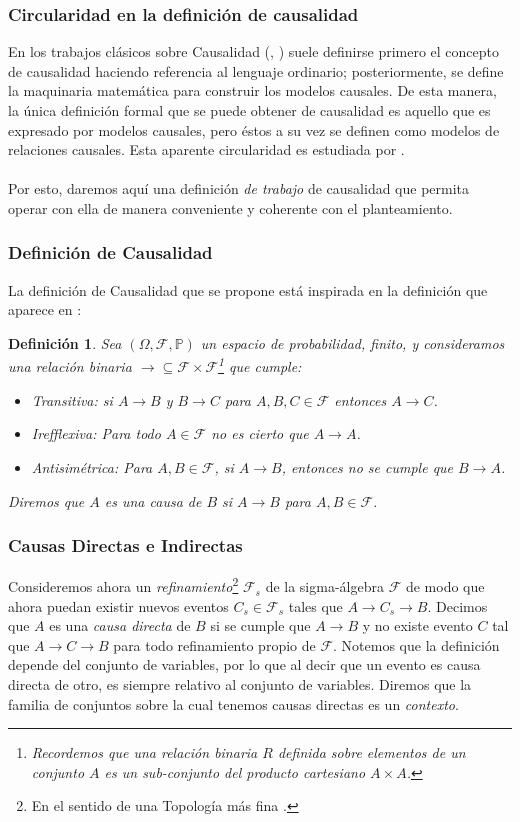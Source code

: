 \documentclass[11pt]{article}
\theoremstyle{plain}
\newtheorem{defi}[teo]{Definición}
\begin{document}
\subsubsection{Circularidad en la definición de causalidad}
En los trabajos clásicos sobre Causalidad (\cite{spirtes2000causation}, \cite{pearl2009causality}) suele definirse primero el concepto de causalidad haciendo referencia al lenguaje ordinario; posteriormente, se define la maquinaria matemática para construir los modelos causales. De esta manera, la única definición formal que se puede obtener de causalidad es aquello que es expresado por modelos causales, pero éstos a su vez se definen como modelos de relaciones causales. Esta aparente circularidad es estudiada por \cite{woodward2005making}.\\
\\
Por esto, daremos aquí una definición \textit{de trabajo} de causalidad que permita operar con ella de manera conveniente y coherente con el planteamiento.

\subsubsection{Definición de Causalidad}
La definición de Causalidad que se propone está inspirada en la definición que aparece en \cite{spirtes2000causation}:
\begin{defi}{\label{defcausa}}
Sea $(\Omega, \mathcal{F}, \mathbb{P})$ un espacio de probabilidad, finito, y consideramos una relación binaria $\to  \subseteq \mathcal{F} \times \mathcal{F}$\footnote{Recordemos que una relación binaria $R$ definida sobre elementos de un conjunto $A$ es un sub-conjunto del producto cartesiano $A \times A$.} que cumple:
\begin{itemize}
\item Transitiva: si $A \to B$ y $B \to C$ para $A,B,C \in \mathcal{F}$ entonces $A \to C$.
\item Irefflexiva: Para todo $A \in \mathcal{F}$ no es cierto que $A \to A$.
\item Antisimétrica: Para $A, B \in \mathcal{F}$, si $A \to B$, entonces no se cumple que $B \to A$.
\end{itemize}
Diremos que $A$ es una causa de $B$ si $A \to B$ para $A,B \in \mathcal{F}$.
\end{defi}

\subsubsection{Causas Directas e Indirectas}
Consideremos ahora un \textit{refinamiento}\footnote{En el sentido de una Topología más fina \cite{munkres2000topology}.} $\mathcal{F}_s$ de la sigma-álgebra $\mathcal{F}$ de modo que ahora puedan existir nuevos eventos $C_s \in \mathcal{F}_s$ tales que $A \to C_s \to B$. Decimos que $A$ es una \textit{causa directa} de $B$ si se cumple que $A \to B$ y no existe evento $C$ tal que $A \to C \to B$ para todo refinamiento propio de $\mathcal{F}$. Notemos que la definición depende del conjunto de variables, por lo que al decir que un evento es causa directa de otro, es siempre relativo al conjunto de variables. Diremos que la familia de conjuntos sobre la cual tenemos causas directas es un \textit{contexto}. 
\end{document}
